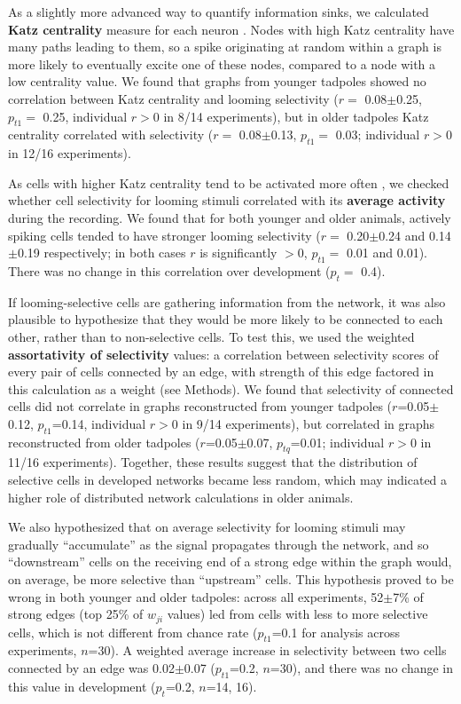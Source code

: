 \documentclass{article}
\begin{document}
As a slightly more advanced way to quantify information sinks, we calculated \textbf{Katz centrality} measure for each neuron \citep{katz1953original,fletcher2018katz}. Nodes with high Katz centrality have many paths leading to them, so a spike originating at random within a graph is more likely to eventually excite one of these nodes, compared to a node with a low centrality value. We found that graphs from younger tadpoles showed no correlation between Katz centrality and looming selectivity ($r =$ 0.08$\pm$0.25, $p_{t1} =$ 0.25, individual $r>$0 in 8/14 experiments), but in older tadpoles Katz centrality correlated with selectivity ($r=$ 0.08$\pm$0.13, $p_{t1}=$ 0.03; individual $r>$0 in 12/16 experiments).

As cells with higher Katz centrality tend to be activated more often \citep{fletcher2018katz}, we checked whether cell selectivity for looming stimuli correlated with its \textbf{average activity} during the recording. We found that for both younger and older animals, actively spiking cells tended to have stronger looming selectivity ($r =$ 0.20$\pm$0.24 and 0.14$\pm$0.19 respectively; in both cases $r$ is significantly $>0$, $p_{t1}=$ 0.01 and 0.01). There was no change in this correlation over development ($p_t=$ 0.4).

If looming-selective cells are gathering information from the network, it was also plausible to hypothesize that they would be more likely to be connected to each other, rather than to non-selective cells. To test this, we used the weighted \textbf{assortativity of selectivity} values: a correlation between selectivity scores of every pair of cells connected by an edge, with strength of this edge factored in this calculation as a weight (see Methods). We found that selectivity of connected cells did not correlate in graphs reconstructed from younger tadpoles ($r$=0.05$\pm$0.12, $p_{t1}$=0.14, individual $r>$0 in 9/14 experiments), but correlated in graphs reconstructed from older tadpoles ($r$=0.05$\pm$0.07, $p_{tq}$=0.01; individual $r>$0 in 11/16 experiments). Together, these results suggest that the distribution of selective cells in developed networks became less random, which may indicated a higher role of distributed network calculations in older animals.

We also hypothesized that on average selectivity for looming stimuli may gradually “accumulate” as the signal propagates through the network, and so “downstream” cells on the receiving end of a strong edge within the graph would, on average, be more selective than “upstream” cells. This hypothesis proved to be wrong in both younger and older tadpoles: across all experiments, 52$\pm$7\% of strong edges (top 25\% of $w_{ji}$ values) led from cells with less to more selective cells, which is not different from chance rate ($p_{t1}$=0.1 for analysis across experiments, $n$=30). A weighted average increase in selectivity between two cells connected by an edge was 0.02$\pm$0.07 ($p_{t1}$=0.2, $n$=30), and there was no change in this value in development ($p_t$=0.2, $n$=14, 16).
\end{document}
